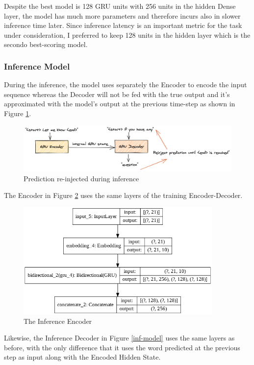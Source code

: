 \documentclass{article}
\begin{document}
Despite the best model is 128 GRU units with 256 units in the hidden Dense layer, the model has much more parameters and therefore incurs also in slower inference time later. Since inference latency is an important metric for the task under consideration, I preferred to keep 128 units in the hidden layer which is the secondo best-scoring model.

\subsubsection{Inference Model}\label{inference-model}

During the inference, the model uses separately the Encoder to encode the input sequence whereas the Decoder will not be fed with the true output and it's approximated with the model's output at the previous time-step as shown in Figure \ref{autoencoder-inference}.

\begin{figure}[htbp]
\centering
\includegraphics[width=7in]{images/autoencoder-inference}
\caption{Prediction re-injected during inference}
\label{autoencoder-inference}
\end{figure}

The Encoder in Figure \ref{encoder} uses the same layers of the training Encoder-Decoder.

\begin{figure}[htbp]
\centering
\includegraphics[width=4in]{images/encoder.png}
\caption{The Inference Encoder}
\label{encoder}
\end{figure}

Likewise, the Inference Decoder in Figure \ref{inf-model} uses the same layers as before, with the only difference that it uses the word predicted at the previous step as input along with the Encoded Hidden State.
\end{document}
